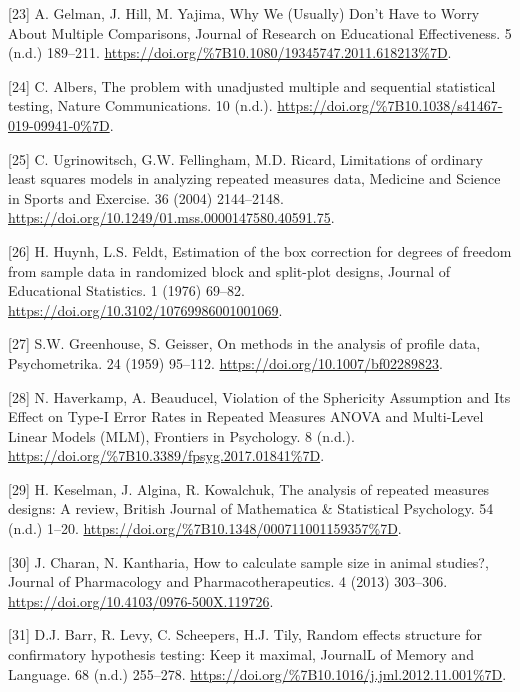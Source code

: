 \documentclass[
]{article}
\begin{document}
\leavevmode\hypertarget{ref-gelman2012}{}%
{[}23{]} A. Gelman, J. Hill, M. Yajima, Why We (Usually) Don't Have to Worry About Multiple Comparisons, Journal of Research on Educational Effectiveness. 5 (n.d.) 189--211. \url{https://doi.org/\%7B10.1080/19345747.2011.618213\%7D}.

\leavevmode\hypertarget{ref-albers2019}{}%
{[}24{]} C. Albers, The problem with unadjusted multiple and sequential statistical testing, Nature Communications. 10 (n.d.). \url{https://doi.org/\%7B10.1038/s41467-019-09941-0\%7D}.

\leavevmode\hypertarget{ref-ugrinowitsch2004}{}%
{[}25{]} C. Ugrinowitsch, G.W. Fellingham, M.D. Ricard, Limitations of ordinary least squares models in analyzing repeated measures data, Medicine and Science in Sports and Exercise. 36 (2004) 2144--2148. \url{https://doi.org/10.1249/01.mss.0000147580.40591.75}.

\leavevmode\hypertarget{ref-huynh1976}{}%
{[}26{]} H. Huynh, L.S. Feldt, Estimation of the box correction for degrees of freedom from sample data in randomized block and split-plot designs, Journal of Educational Statistics. 1 (1976) 69--82. \url{https://doi.org/10.3102/10769986001001069}.

\leavevmode\hypertarget{ref-greenhouse1959}{}%
{[}27{]} S.W. Greenhouse, S. Geisser, On methods in the analysis of profile data, Psychometrika. 24 (1959) 95--112. \url{https://doi.org/10.1007/bf02289823}.

\leavevmode\hypertarget{ref-haverkamp2017}{}%
{[}28{]} N. Haverkamp, A. Beauducel, Violation of the Sphericity Assumption and Its Effect on Type-I Error Rates in Repeated Measures ANOVA and Multi-Level Linear Models (MLM), Frontiers in Psychology. 8 (n.d.). \url{https://doi.org/\%7B10.3389/fpsyg.2017.01841\%7D}.

\leavevmode\hypertarget{ref-keselman2001}{}%
{[}29{]} H. Keselman, J. Algina, R. Kowalchuk, The analysis of repeated measures designs: A review, British Journal of Mathematica \& Statistical Psychology. 54 (n.d.) 1--20. \url{https://doi.org/\%7B10.1348/000711001159357\%7D}.

\leavevmode\hypertarget{ref-charan2013}{}%
{[}30{]} J. Charan, N. Kantharia, How to calculate sample size in animal studies?, Journal of Pharmacology and Pharmacotherapeutics. 4 (2013) 303--306. \url{https://doi.org/10.4103/0976-500X.119726}.

\leavevmode\hypertarget{ref-barr2013}{}%
{[}31{]} D.J. Barr, R. Levy, C. Scheepers, H.J. Tily, Random effects structure for confirmatory hypothesis testing: Keep it maximal, JournalL of Memory and Language. 68 (n.d.) 255--278. \url{https://doi.org/\%7B10.1016/j.jml.2012.11.001\%7D}.
\end{document}
